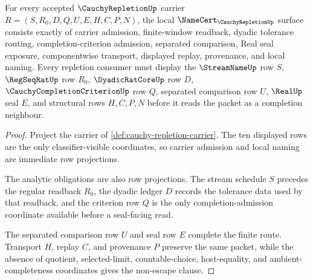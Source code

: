 \begin{theorem}
\label{thm:cauchy-repletion-namecert-obligations}
For every accepted $\CauchyRepletionUp$ carrier $R=(S,R_0,D,Q,U,E,H,C,P,N)$, the local $\NameCert_{\CauchyRepletionUp}$ surface consists exactly of carrier admission, finite-window readback, dyadic tolerance routing, completion-criterion admission, separated comparison, Real seal exposure, componentwise transport, displayed replay, provenance, and local naming. Every repletion consumer must display the $\StreamNameUp$ row $S$, $\RegSeqRatUp$ row $R_0$, $\DyadicRatCoreUp$ row $D$, $\CauchyCompletionCriterionUp$ row $Q$, separated comparison row $U$, $\RealUp$ seal $E$, and structural rows $H,C,P,N$ before it reads the packet as a completion neighbour.
\end{theorem}
\begin{proof}
Project the carrier of \autoref{def:cauchy-repletion-carrier}. The ten displayed rows are the only classifier-visible coordinates, so carrier admission and local naming are immediate row projections.

The analytic obligations are also row projections. The stream schedule $S$ precedes the regular readback $R_0$, the dyadic ledger $D$ records the tolerance data used by that readback, and the criterion row $Q$ is the only completion-admission coordinate available before a seal-facing read.

The separated comparison row $U$ and seal row $E$ complete the finite route. Transport $H$, replay $C$, and provenance $P$ preserve the same packet, while the absence of quotient, selected-limit, countable-choice, host-equality, and ambient-completeness coordinates gives the non-escape clause.
\end{proof}



